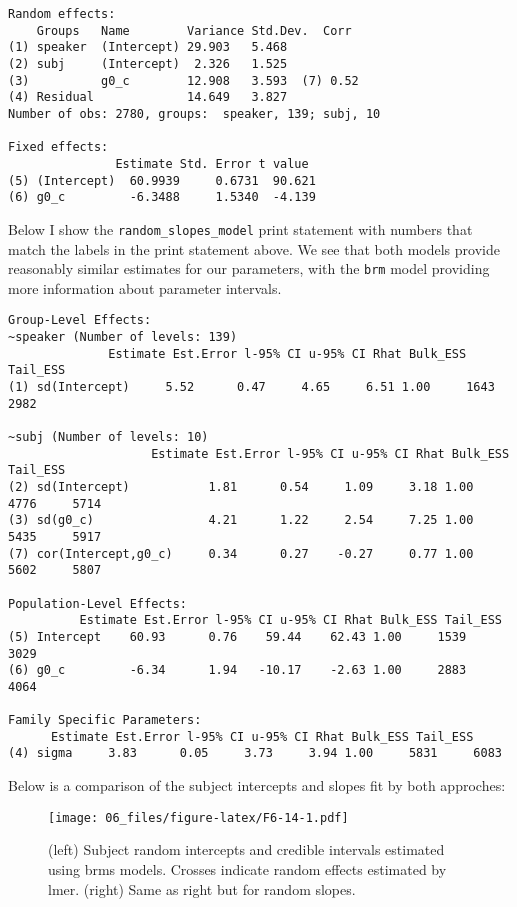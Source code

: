 \documentclass[
]{book}
\begin{document}
\begin{verbatim}
Random effects:
    Groups   Name        Variance Std.Dev.  Corr
(1) speaker  (Intercept) 29.903   5.468        
(2) subj     (Intercept)  2.326   1.525        
(3)          g0_c        12.908   3.593  (7) 0.52
(4) Residual             14.649   3.827        
Number of obs: 2780, groups:  speaker, 139; subj, 10

Fixed effects:
               Estimate Std. Error t value
(5) (Intercept)  60.9939     0.6731  90.621
(6) g0_c         -6.3488     1.5340  -4.139
\end{verbatim}

Below I show the \texttt{random\_slopes\_model} print statement with numbers that match the labels in the print statement above. We see that both models provide reasonably similar estimates for our parameters, with the \texttt{brm} model providing more information about parameter intervals.

\begin{verbatim}
Group-Level Effects: 
~speaker (Number of levels: 139) 
              Estimate Est.Error l-95% CI u-95% CI Rhat Bulk_ESS Tail_ESS
(1) sd(Intercept)     5.52      0.47     4.65     6.51 1.00     1643     2982

~subj (Number of levels: 10) 
                    Estimate Est.Error l-95% CI u-95% CI Rhat Bulk_ESS Tail_ESS
(2) sd(Intercept)           1.81      0.54     1.09     3.18 1.00     4776     5714
(3) sd(g0_c)                4.21      1.22     2.54     7.25 1.00     5435     5917
(7) cor(Intercept,g0_c)     0.34      0.27    -0.27     0.77 1.00     5602     5807

Population-Level Effects: 
          Estimate Est.Error l-95% CI u-95% CI Rhat Bulk_ESS Tail_ESS
(5) Intercept    60.93      0.76    59.44    62.43 1.00     1539     3029
(6) g0_c         -6.34      1.94   -10.17    -2.63 1.00     2883     4064

Family Specific Parameters: 
      Estimate Est.Error l-95% CI u-95% CI Rhat Bulk_ESS Tail_ESS
(4) sigma     3.83      0.05     3.73     3.94 1.00     5831     6083
\end{verbatim}

Below is a comparison of the subject intercepts and slopes fit by both approches:

\begin{figure}
\centering
\texttt{[image: 06\_files/figure-latex/F6-14-1.pdf]}
\caption{\label{fig:F6-14}(left) Subject random intercepts and credible intervals estimated using brms models. Crosses indicate random effects estimated by lmer. (right) Same as right but for random slopes.}
\end{figure}
\end{document}
